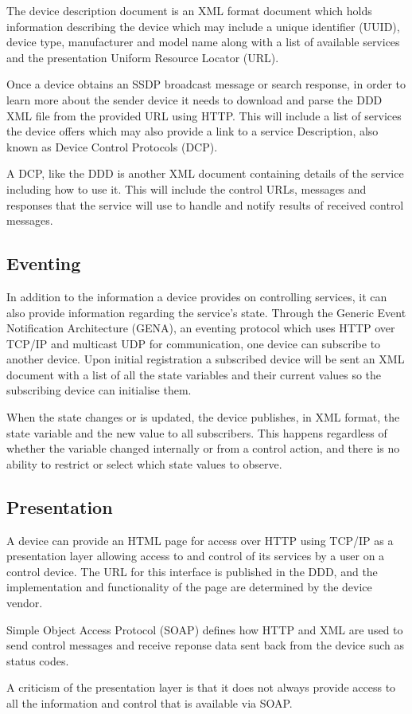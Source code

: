 The device description document is an XML format document which holds information describing the device which may include a unique identifier (UUID), device type, manufacturer and model name along with a list of available services and the presentation Uniform Resource Locator (URL)\cite{appinf-ddd}.

Once a device obtains an SSDP broadcast message or search response, in order to learn more about the sender device it needs to download and parse the DDD XML file from the provided URL using HTTP. This will include a list of services the device offers which may also provide a link to a service Description, also known as Device Control Protocols (DCP)\cite{UPnPWindowsXP}.

A DCP, like the DDD is another XML document containing details of the service including how to use it. This will include the control URLs, messages and responses that the service will use to handle and notify results of received control messages.

\subsection{Eventing}

In addition to the information a device provides on controlling services, it can also provide information regarding the service's state. Through the Generic Event Notification Architecture (GENA)\cite{UPnPWindowsXP}, an eventing protocol which uses HTTP over TCP/IP and multicast UDP for communication\cite{understanding-upnp}, one device can subscribe to another device. Upon initial registration a subscribed device will be sent an XML document with a list of all the state variables and their current values so the subscribing device can initialise them\cite{UPnPWindowsXP}.

When the state changes or is updated, the device publishes, in XML format, the state variable and the new value to all subscribers. This happens regardless of whether the variable changed internally or from a control action, and there is no ability to restrict or select which state values to observe\cite{UPnPWindowsXP}.

\subsection{Presentation}

A device can provide an HTML page for access over HTTP using TCP/IP as a presentation layer allowing access to and control of its services by a user on a control device. The URL for this interface is published in the DDD, and the implementation and functionality of the page are determined by the device vendor\cite{UPnPWindowsXP}.

Simple Object Access Protocol (SOAP)\cite{soap} defines how HTTP and XML are used to send control messages and receive reponse data sent back from the device such as status codes.

A criticism of the presentation layer is that it does not always provide access to all the information and control that is available via SOAP\cite{upnphacks}.